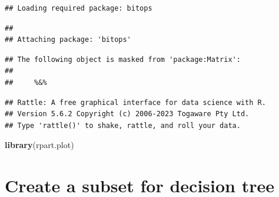 \documentclass[
]{article}
\newenvironment{Shaded}{\begin{snugshade}}{\end{snugshade}}
\newcommand{\FunctionTok}[1]{\textcolor[rgb]{0.13,0.29,0.53}{\textbf{#1}}}
\newcommand{\NormalTok}[1]{#1}
\begin{document}
\begin{verbatim}
## Loading required package: bitops
\end{verbatim}

\begin{verbatim}
## 
## Attaching package: 'bitops'
\end{verbatim}

\begin{verbatim}
## The following object is masked from 'package:Matrix':
## 
##     %&%
\end{verbatim}

\begin{verbatim}
## Rattle: A free graphical interface for data science with R.
## Version 5.6.2 Copyright (c) 2006-2023 Togaware Pty Ltd.
## Type 'rattle()' to shake, rattle, and roll your data.
\end{verbatim}

\begin{Shaded}
\begin{Highlighting}[]
\FunctionTok{library}\NormalTok{(rpart.plot)}
\end{Highlighting}
\end{Shaded}

\section{Create a subset for decision
tree}\label{create-a-subset-for-decision-tree}
\end{document}

